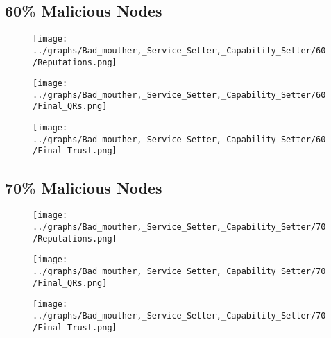 \documentclass{article}
\begin{document}
  \begin{minipage}[t]{0.49\columnwidth}
    \subsection*{60\% Malicious Nodes}
        \begin{figure}[H]
            \centering
            \texttt{[image: ../graphs/Bad\_mouther,\_Service\_Setter,\_Capability\_Setter/60/Reputations.png]}
        \end{figure}
        \begin{figure}[H]
            \centering
            \texttt{[image: ../graphs/Bad\_mouther,\_Service\_Setter,\_Capability\_Setter/60/Final\_QRs.png]}
        \end{figure}
    \end{minipage}
    \begin{minipage}[t]{0.49\columnwidth}
        \begin{figure}[H]
            \centering
            \texttt{[image: ../graphs/Bad\_mouther,\_Service\_Setter,\_Capability\_Setter/60/Final\_Trust.png]}
        \end{figure}
    \end{minipage}

  \begin{minipage}[t]{0.49\columnwidth}
    \subsection*{70\% Malicious Nodes}
        \begin{figure}[H]
            \centering
            \texttt{[image: ../graphs/Bad\_mouther,\_Service\_Setter,\_Capability\_Setter/70/Reputations.png]}
        \end{figure}
        \begin{figure}[H]
            \centering
            \texttt{[image: ../graphs/Bad\_mouther,\_Service\_Setter,\_Capability\_Setter/70/Final\_QRs.png]}
        \end{figure}
    \end{minipage}
    \begin{minipage}[t]{0.49\columnwidth}
        \begin{figure}[H]
            \centering
            \texttt{[image: ../graphs/Bad\_mouther,\_Service\_Setter,\_Capability\_Setter/70/Final\_Trust.png]}
        \end{figure}
    \end{minipage}
\end{document}
